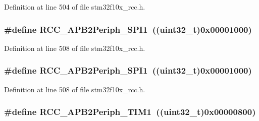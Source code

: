 Definition at line 504 of file stm32f10x\+\_\+rcc.\+h.

\subsubsection[{\texorpdfstring{R\+C\+C\+\_\+\+A\+P\+B2\+Periph\+\_\+\+S\+P\+I1}{RCC_APB2Periph_SPI1}}]{\setlength{\rightskip}{0pt plus 5cm}\#define R\+C\+C\+\_\+\+A\+P\+B2\+Periph\+\_\+\+S\+P\+I1~(({\bf uint32\+\_\+t})0x00001000)}\hypertarget{group___a_p_b2__peripheral_ga289cc086580f4b6a080ea0ed3dd4a7af}{}\label{group___a_p_b2__peripheral_ga289cc086580f4b6a080ea0ed3dd4a7af}


Definition at line 508 of file stm32f10x\+\_\+rcc.\+h.

\subsubsection[{\texorpdfstring{R\+C\+C\+\_\+\+A\+P\+B2\+Periph\+\_\+\+S\+P\+I1}{RCC_APB2Periph_SPI1}}]{\setlength{\rightskip}{0pt plus 5cm}\#define R\+C\+C\+\_\+\+A\+P\+B2\+Periph\+\_\+\+S\+P\+I1~(({\bf uint32\+\_\+t})0x00001000)}\hypertarget{group___a_p_b2__peripheral_ga289cc086580f4b6a080ea0ed3dd4a7af}{}\label{group___a_p_b2__peripheral_ga289cc086580f4b6a080ea0ed3dd4a7af}


Definition at line 508 of file stm32f10x\+\_\+rcc.\+h.

\subsubsection[{\texorpdfstring{R\+C\+C\+\_\+\+A\+P\+B2\+Periph\+\_\+\+T\+I\+M1}{RCC_APB2Periph_TIM1}}]{\setlength{\rightskip}{0pt plus 5cm}\#define R\+C\+C\+\_\+\+A\+P\+B2\+Periph\+\_\+\+T\+I\+M1~(({\bf uint32\+\_\+t})0x00000800)}\hypertarget{group___a_p_b2__peripheral_ga0d9babf212897db0b3aa852f8a71160b}{}\label{group___a_p_b2__peripheral_ga0d9babf212897db0b3aa852f8a71160b}


